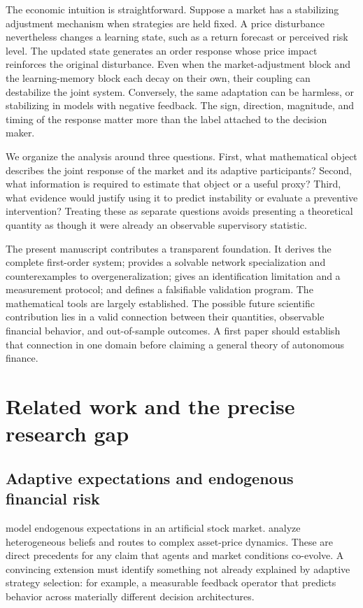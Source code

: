 \documentclass[11pt,a4paper]{article}
\theoremstyle{definition}
\theoremstyle{remark}
\begin{document}
The economic intuition is straightforward. Suppose a market has a stabilizing adjustment mechanism when strategies are held fixed. A price disturbance nevertheless changes a learning state, such as a return forecast or perceived risk level. The updated state generates an order response whose price impact reinforces the original disturbance. Even when the market-adjustment block and the learning-memory block each decay on their own, their coupling can destabilize the joint system. Conversely, the same adaptation can be harmless, or stabilizing in models with negative feedback. The sign, direction, magnitude, and timing of the response matter more than the label attached to the decision maker.

We organize the analysis around three questions. First, what mathematical object describes the joint response of the market and its adaptive participants? Second, what information is required to estimate that object or a useful proxy? Third, what evidence would justify using it to predict instability or evaluate a preventive intervention? Treating these as separate questions avoids presenting a theoretical quantity as though it were already an observable supervisory statistic.

The present manuscript contributes a transparent foundation. It derives the complete first-order system; provides a solvable network specialization and counterexamples to overgeneralization; gives an identification limitation and a measurement protocol; and defines a falsifiable validation program. The mathematical tools are largely established. The possible future scientific contribution lies in a valid connection between their quantities, observable financial behavior, and out-of-sample outcomes. A first paper should establish that connection in one domain before claiming a general theory of autonomous finance.

\section{Related work and the precise research gap}
\label{sec:related}
\subsection{Adaptive expectations and endogenous financial risk}
\citet{arthur1996} model endogenous expectations in an artificial stock market. \citet{brock1998} analyze heterogeneous beliefs and routes to complex asset-price dynamics. These are direct precedents for any claim that agents and market conditions co-evolve. A convincing extension must identify something not already explained by adaptive strategy selection: for example, a measurable feedback operator that predicts behavior across materially different decision architectures.
\end{document}
